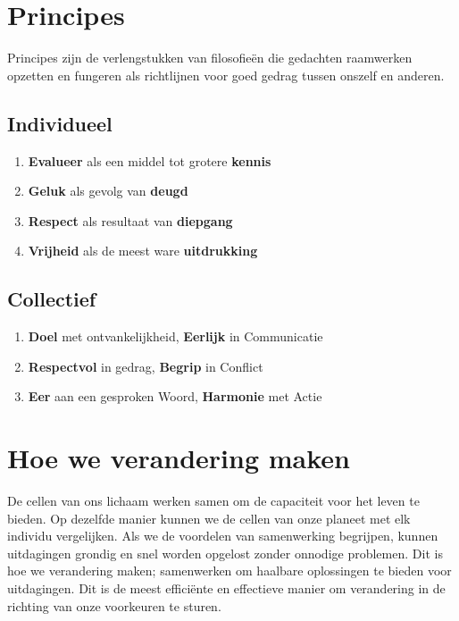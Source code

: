 \documentclass[11pt]{article}
\begin{document}
\section{Principes}

Principes zijn de verlengstukken van filosofie\"en die gedachten raamwerken opzetten en fungeren als richtlijnen voor goed gedrag tussen onszelf en anderen.

\subsection{Individueel}

\begin{enumerate}
\item \textbf{Evalueer} als een middel tot grotere \textbf{kennis}
\item \textbf{Geluk} als gevolg van \textbf{deugd}
\item \textbf{Respect} als resultaat van \textbf{diepgang}
\item \textbf{Vrijheid} als de meest ware \textbf{uitdrukking}
\end{enumerate}

\subsection{Collectief}

\begin{enumerate}
\item \textbf{Doel} met ontvankelijkheid, \textbf{Eerlijk} in Communicatie
\item \textbf{Respectvol} in gedrag, \textbf{Begrip} in Conflict
\item \textbf{Eer} aan een gesproken Woord, \textbf{Harmonie} met Actie
\end{enumerate}

\section{Hoe we verandering maken}

De cellen van ons lichaam werken samen om de capaciteit voor het leven te bieden. Op dezelfde manier kunnen we de cellen van onze planeet met elk individu vergelijken. Als we de voordelen van samenwerking begrijpen, kunnen uitdagingen grondig en snel worden opgelost zonder onnodige problemen. Dit is hoe we verandering maken; samenwerken om haalbare oplossingen te bieden voor uitdagingen. Dit is de meest effici\"ente en effectieve manier om verandering in de richting van onze voorkeuren te sturen.\\
\end{document}
